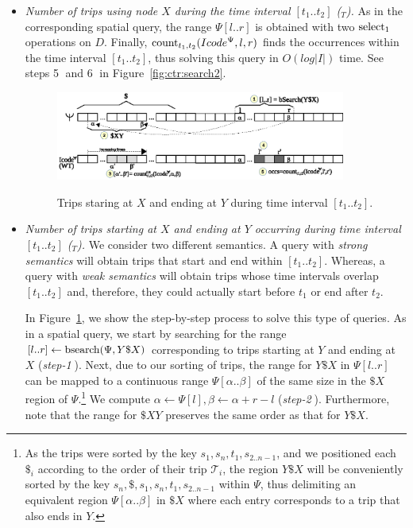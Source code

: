 \begin{itemize}
		\item {\em Number of trips using node $X$ during the time interval $[t_1..t_2]$ (\loadX$_T$).}
		As in the corresponding spatial query, the range $\Psi[l..r]$  is obtained with two $\operatorname{select}_1$ operations on $D$.
		Finally, $\operatorname{count}_{t_1,t_2}(Icode^{\Psi},l,r)$ finds the occurrences within the time interval $[t_1..t_2]$, thus solving this query in $O(log|I|)$ time.
		See steps \textcircled{5} and \textcircled{6} in Figure~\ref{fig:ctr:search2}.


	\begin{figure}[th]
		\begin{center}
			{\includegraphics[width=0.90\textwidth]{figures/search.eps}}
		\end{center}
		\caption{Trips staring at $X$ and ending at $Y$ during time interval $[t_1..t_2]$.}
		\label{fig:ctr:search}
	\end{figure}
	
		\item {\em Number of trips starting at $X$ and ending at $Y$ occurring during  time interval $[t_1..t_2]$ (\XtoY$_T$).}
		We consider two different semantics. A query with  {\em strong semantics} will obtain trips
		that start and end within  $[t_1..t_2]$. Whereas, a query with  {\em weak semantics} will obtain trips whose time intervals overlap  $[t_1..t_2]$ and, therefore, they could actually start before $t_1$ or end after $t_2$.
		
		In Figure~\ref{fig:ctr:search}, we show the step-by-step process to solve this type of queries.
		As in a spatial query, we start by searching for the range $[l..r] \leftarrow \operatorname{bsearch}(\Psi,Y\$X)$ corresponding 
		to trips starting at $Y$ and ending at $X$ ({\em step-\textcircled{1}}). Next, due to our sorting of trips, the range for $Y\$X$ in $\Psi[l..r]$
		can be mapped to a continuous range $\Psi[\alpha..\beta]$ of the same size in the $\$X$ region of $\Psi$.\footnote{As the trips were sorted by the key $s_1,s_n,t_1,s_{2..n-1}$, and we positioned each $\$_i$ according to the order of their trip $\mathcal{T}_i$, the region $Y\$X$ will be conveniently sorted by the key $s_n,\$,s_1,s_n,t_1,s_{2..n-1}$ within $\Psi$, thus delimiting an equivalent region $\Psi[\alpha..\beta]$ in $\$X$ where each entry corresponds to a trip that also ends in $Y$.} 
		We compute $\alpha \leftarrow \Psi[l], 
		\beta\leftarrow\alpha+r-l$ ({\em step-\textcircled{2}}). Furthermore, note that the range for $\$XY$ preserves the same order as that for $Y\$X$.
		

\end{itemize}
